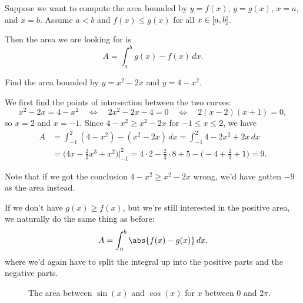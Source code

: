 \noindent
Suppose we want to compute the area bounded by $y = f(x)$, $y = g(x)$, $x = a$, and $x = b$.
Assume $a < b$ and $f(x) \leq g(x)$ for all $x \in \interval{a}{b}$.

Then the area we are looking for is
\[
	A = \int_a^b g(x) - f(x) \, d x.
\]

\begin{example}
	Find the area bounded by $y = x^2 - 2x$ and $y = 4 - x^2$.

	We first find the points of intersection between the two curves:
	\[
		x^2 - 2x = 4 - x^2 \quad \Longleftrightarrow \quad 2 x^2 - 2 x - 4 = 0 \quad \Longleftrightarrow \quad 2(x - 2)(x + 1) = 0,
	\]
	so $x = 2$ and $x = -1$.
	Since $4 - x^2 \geq x^2 - 2 x$ for $-1 \leq x \leq 2$, we have
	\begin{align*}
		A & = \int_{-1}^2 (4 - x^2) - (x^2 - 2 x) \, d x = \int_{-1}^2 4 - 2x^2 + 2x \, d x                                                                  \\
		  & = \Big ( 4 x - \frac{2}{3} x^3 + x^2 \Big ) \biggr \rvert_{-1}^2 = 4 \cdot 2 - \frac{2}{3} \cdot 8 + 5 - \Big ( -4 + \frac{2}{3} + 1 \Big ) = 9.
	\end{align*}

	\noindent
	Note that if we got the conclusion $4 - x^2 \geq x^2 - 2 x$ wrong, we'd have gotten $-9$ as the area instead.
\end{example}

\noindent
If we don't have $g(x) \geq f(x)$, but we're still interested in the positive area, we naturally do the same thing as before:
\[
	A = \int_a^b \abs{f(x) - g(x)} \, d x,
\]
where we'd again have to split the integral up into the positive parts and the negative parts.

\begin{figure}[t!]
	\centering
	\caption{The area between $\sin(x)$ and $\cos(x)$ for $x$ between $0$ and $2 \pi$. }
	\label{lec11:areaexample}
\end{figure}


